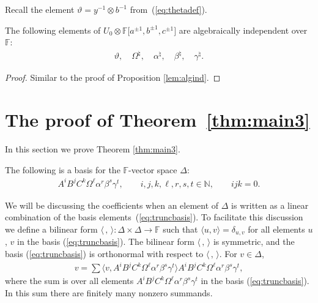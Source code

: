  Recall the element
$\vartheta = y^{-1} \otimes b^{-1}$ from~(\ref{eq:thetadef}).

\begin{Proposition}
\label{lem:algind2}
The following elements of
$U_0\otimes
\mathbb F \lbrack a^{\pm 1}, b^{\pm 1}, c^{\pm 1}\rbrack $
are algebraically independent over $\mathbb F$:
\begin{gather*}
\vartheta, \quad \Omega^\natural,
\quad
\alpha^\natural,
\quad
\beta^\natural,
\quad
\gamma^\natural.
\end{gather*}
\end{Proposition}
\begin{proof}
Similar to the proof of
Proposition
\ref{lem:algind}.
\end{proof}


\section{The proof of Theorem~\ref{thm:main3}}\label{section9}

In this section we prove
Theorem
\ref{thm:main3}.

\begin{Lemma}
\label{lem:altbasisdelta}
The following is a basis for the $\mathbb F$-vector space
$\Delta$:
\begin{gather}
A^iB^jC^k\Omega^\ell \alpha^r \beta^s \gamma^t, \qquad
i,j,k,\ell, r,s,t\in \mathbb N,
\qquad   ijk=0.
\label{eq:truncbasis}
\end{gather}
\end{Lemma}


 We will be discussing
 the coef\/f\/icients
when an element of $\Delta$ is written as a linear
combination of the basis elements~(\ref{eq:truncbasis}). To facilitate this discussion
we def\/ine a bilinear form
$\langle \,,\,\rangle : \Delta \times \Delta \to \mathbb F$
such that $\langle u,v\rangle = \delta_{u,v}$
for all elements $u$, $v$ in the basis
(\ref{eq:truncbasis}). The bilinear form
$\langle\,,\,\rangle$ is symmetric, and
the basis
(\ref{eq:truncbasis}) is
orthonormal with respect to
$\langle \,,\, \rangle $.
For $v \in \Delta$,
\begin{gather*}
v = \sum \langle v, A^iB^jC^k\Omega^\ell\alpha^r\beta^s\gamma^t \rangle
 A^iB^jC^k\Omega^\ell\alpha^r\beta^s\gamma^t,
\label{eq:truncbilsum}
\end{gather*}
where the sum is over all elements
 $A^iB^jC^k\Omega^\ell\alpha^r\beta^s\gamma^t$ in the basis
(\ref{eq:truncbasis}). In this sum there are f\/initely
many nonzero summands.


